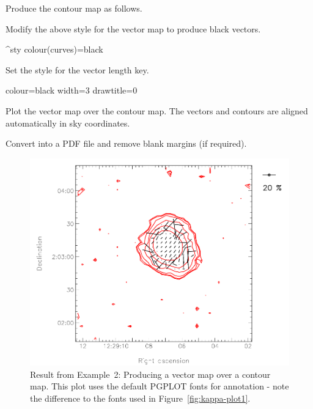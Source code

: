 Produce the contour map as follows.

\begin{terminalv}
\end{terminalv}


Modify the above style for the vector map to produce black vectors.

\begin{terminalv}
^sty
colour(curves)=black
\end{terminalv}


Set the style for the vector length key.


\begin{terminalv}
colour=black
width=3
drawtitle=0
\end{terminalv}

Plot the vector map over the contour map. The vectors and contours are
aligned automatically in sky coordinates.

\begin{terminalv}
\end{terminalv}


Convert into a PDF file and remove blank margins (if required).

\begin{terminalv}
\end{terminalv}

\begin{figure}[t!]
\begin{center}
\includegraphics[width=0.75\linewidth]{sc22-kappa-plots-plot2.png}

\caption [Vector map with contour map in polplot]{Result from Example~2:
  Producing a vector map over a contour map. This plot uses the default
PGPLOT fonts for annotation - note the difference to the fonts used in
Figure~\ref{fig:kappa-plot1}. \label{fig:kappa-plot2}}
\end{center}
\end{figure}

